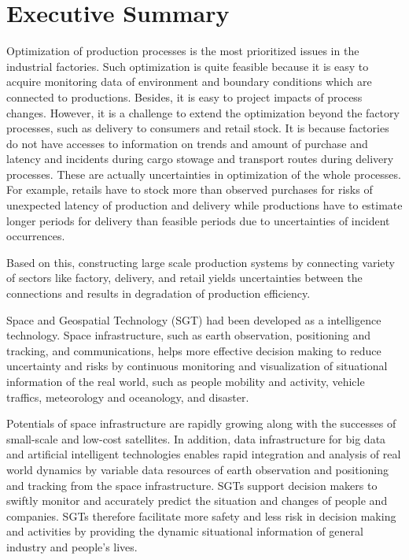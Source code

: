 \chapter*{Executive Summary}

Optimization of production processes is the most prioritized issues in the industrial factories. Such optimization is quite feasible because it is easy to acquire monitoring data  of environment and boundary conditions which are connected to productions. Besides, it is easy to project impacts of process changes. However, it is a challenge to extend the optimization beyond the factory processes, such as delivery to consumers and retail stock. It is  because factories do not have accesses to information on trends and amount of purchase and latency and incidents during cargo stowage and transport routes during delivery processes. These are actually uncertainties in optimization of the whole processes. For example, retails have to stock more than observed purchases for risks of unexpected latency of production and delivery while productions have to estimate longer periods for delivery than feasible periods due to uncertainties of incident occurrences.

Based on this, constructing large scale production systems by connecting variety of sectors like factory, delivery, and retail yields uncertainties between the connections and results in degradation of production efficiency.

Space and Geospatial Technology (SGT) had been developed as a intelligence technology. Space infrastructure, such as earth observation, positioning and tracking, and communications, helps more effective decision making to reduce uncertainty and risks by continuous monitoring and visualization of situational information of the real world, such as people mobility and activity, vehicle traffics, meteorology and oceanology,  and disaster.

Potentials of space infrastructure are rapidly growing along with the successes of small-scale and low-cost satellites. In addition, data infrastructure for big data and artificial intelligent technologies enables rapid integration and analysis of real world dynamics by variable data resources of earth observation and positioning and tracking from the space  infrastructure. SGTs support decision makers to swiftly monitor and accurately predict the situation and changes of people and companies. SGTs therefore facilitate more safety and less risk in decision making and activities by providing the dynamic situational information of general industry and people's lives.

